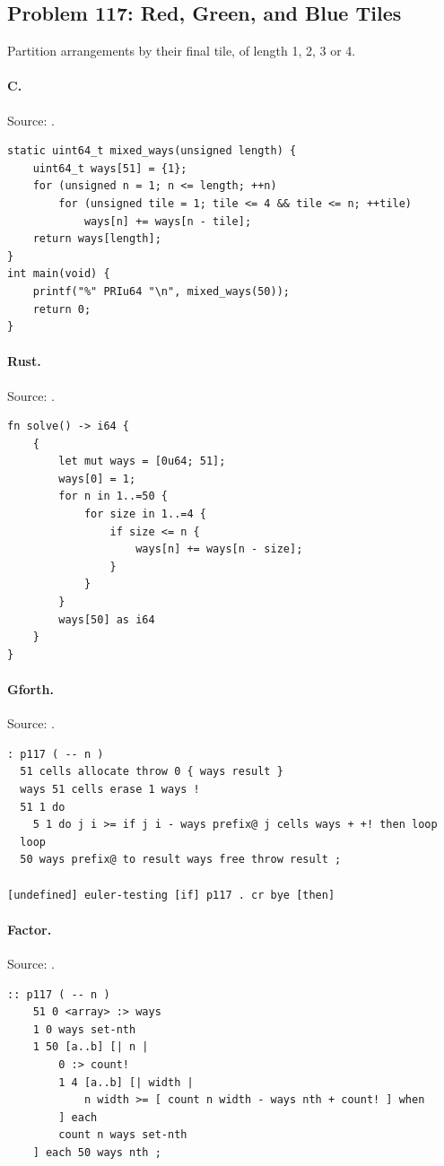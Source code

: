 \subsection{Problem 117: Red, Green, and Blue Tiles}
\label{walkthrough:p117}
Partition arrangements by their final tile, of length 1, 2, 3 or 4.

\paragraph{C.} Source: .
\begin{lstlisting}
static uint64_t mixed_ways(unsigned length) {
    uint64_t ways[51] = {1};
    for (unsigned n = 1; n <= length; ++n)
        for (unsigned tile = 1; tile <= 4 && tile <= n; ++tile)
            ways[n] += ways[n - tile];
    return ways[length];
}
int main(void) {
    printf("%" PRIu64 "\n", mixed_ways(50));
    return 0;
}
\end{lstlisting}

\paragraph{Rust.} Source: .
\begin{lstlisting}
fn solve() -> i64 {
    {
        let mut ways = [0u64; 51];
        ways[0] = 1;
        for n in 1..=50 {
            for size in 1..=4 {
                if size <= n {
                    ways[n] += ways[n - size];
                }
            }
        }
        ways[50] as i64
    }
}
\end{lstlisting}

\paragraph{Gforth.} Source: .
\begin{lstlisting}
: p117 ( -- n )
  51 cells allocate throw 0 { ways result }
  ways 51 cells erase 1 ways !
  51 1 do
    5 1 do j i >= if j i - ways prefix@ j cells ways + +! then loop
  loop
  50 ways prefix@ to result ways free throw result ;

[undefined] euler-testing [if] p117 . cr bye [then]
\end{lstlisting}

\paragraph{Factor.} Source: .
\begin{lstlisting}
:: p117 ( -- n )
    51 0 <array> :> ways
    1 0 ways set-nth
    1 50 [a..b] [| n |
        0 :> count!
        1 4 [a..b] [| width |
            n width >= [ count n width - ways nth + count! ] when
        ] each
        count n ways set-nth
    ] each 50 ways nth ;
\end{lstlisting}

